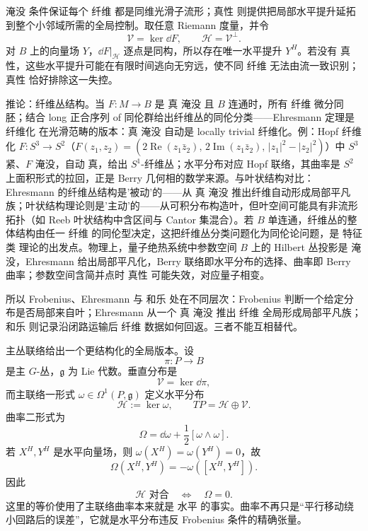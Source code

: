淹没 条件保证每个 纤维 都是同维光滑子流形；真性 则提供把局部水平提升延拓到整个小邻域所需的全局控制。取任意 Riemann 度量，并令
\[
\mathcal V=\ker\dd F,
\qquad
\mathcal H=\mathcal V^\perp.
\]
对 $B$ 上的向量场 $Y$，$\dd F|_{\mathcal H}$ 逐点是同构，所以存在唯一水平提升 $Y^H$。若没有 真性，这些水平提升可能在有限时间逃向无穷远，使不同 纤维 无法由流一致识别；真性 恰好排除这一失控。

推论：纤维丛结构。当 $F:M\to B$ 是 真 淹没 且 $B$ 连通时，所有 纤维 微分同胚；结合 long 正合序列 of 同伦群给出纤维丛的同伦分类——Ehresmann 定理是 纤维化 在光滑范畴的版本：真 淹没 自动是 locally trivial 纤维化。例：Hopf 纤维化 $F:S^3\to S^2$（$F(z_1,z_2)=(2\operatorname{Re}(z_1\bar z_2),\,2\operatorname{Im}(z_1\bar z_2),\,|z_1|^2-|z_2|^2)$）中 $S^3$ 紧、$F$ 淹没，自动 真，给出 $S^1$-纤维丛；水平分布对应 Hopf 联络，其曲率是 $S^2$ 上面积形式的拉回，正是 Berry 几何相的数学来源。与叶状结构对比：Ehresmann 的纤维丛结构是'被动'的——从 真 淹没 推出纤维自动形成局部平凡族；叶状结构理论则是'主动'的——从可积分布构造叶，但叶空间可能具有非流形拓扑（如 Reeb 叶状结构中含区间与 Cantor 集混合）。若 $B$ 单连通，纤维丛的整体结构由任一 纤维 的同伦型决定，这把纤维丛分类问题化为同伦论问题，是 特征类 理论的出发点。物理上，量子绝热系统中参数空间 $B$ 上的 Hilbert 丛投影是 淹没，Ehresmann 给出局部平凡化，Berry 联络即水平分布的选择、曲率即 Berry 曲率；参数空间含简并点时 真性 可能失效，对应量子相变。

所以 Frobenius、Ehresmann 与 和乐 处在不同层次：Frobenius 判断一个给定分布是否局部来自叶；Ehresmann 从一个 真 淹没 推出 纤维 全局形成局部平凡族；和乐 则记录沿闭路运输后 纤维 数据如何回返。三者不能互相替代。

主丛联络给出一个更结构化的全局版本。设
\[
 \pi:P\to B
\]
是主 $G$-丛，$\mathfrak g$ 为 Lie 代数。垂直分布是
\[
 \mathcal V=\ker\dd\pi,
\]
而主联络一形式 $\omega\in\Omega^1(P,\mathfrak g)$ 定义水平分布
\begin{equation*}\mathcal H:=\ker\omega,
 \qquad
 TP=\mathcal H\oplus\mathcal V.
\end{equation*}
曲率二形式为
\begin{equation*}\Omega
 =\dd\omega+\frac12[\omega\wedge\omega].
\end{equation*}
若 $X^H,Y^H$ 是水平向量场，则 $\omega(X^H)=\omega(Y^H)=0$，故
\begin{equation}\label{eq:math-dg-curvature-nonintegrability}
 {
 \Omega(X^H,Y^H)
 =-\omega([X^H,Y^H]).}
\end{equation}
因此
\begin{equation}\label{eq:math-dg-horizontal-frobenius}
 {
 \mathcal H\text{ 对合}
 \quad\Longleftrightarrow\quad
 \Omega=0.}
\end{equation}
这里的等价使用了主联络曲率本来就是 水平 的事实。曲率不再只是“平行移动绕小回路后的误差”，它就是水平分布违反 Frobenius 条件的精确张量。

